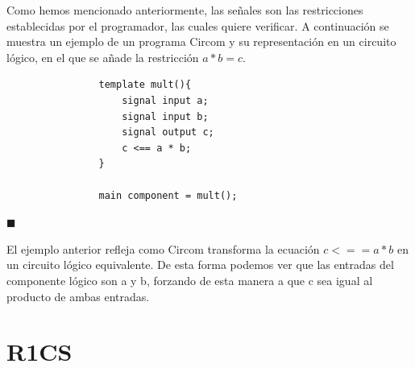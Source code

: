 \documentclass[a4paper,12pt]{report}
\begin{document}
	
	\vspace{0.3cm}
	\vspace{0.5cm}
	
	\noindent Como hemos mencionado anteriormente, las señales son las restricciones establecidas por el programador, las cuales quiere verificar. A continuación se muestra un ejemplo de un programa Circom y su representación en un circuito lógico, en el que se añade la restricción $a*b=c$.
	
	
	\begin{mi_ejemplo}[H]
		\centering
		\begin{minipage}{0.55\textwidth}
			\lstset{
				language=Circom,
				basicstyle=\footnotesize\ttfamily, 
				frame=single,
				breaklines=true
			}
			\begin{lstlisting}
				template mult(){
					signal input a;
					signal input b;
					signal output c;
					c <== a * b;
				}
				
				main component = mult();
			\end{lstlisting}
		\end{minipage}
		\hfill
		
		\begin{minipage}{0.45\textwidth}
			\centering
		\end{minipage}
		
		\caption{Ilustración comparativa código-circuito}
		\label{ex:varA-dist-zero}
		
		\hspace*{\fill} $\blacksquare$
	\end{mi_ejemplo}
	
	\vspace{0.2cm}
	
	\noindent El ejemplo anterior refleja como Circom transforma la ecuación $c<==a*b$ en un circuito lógico equivalente. De esta forma podemos ver que las entradas del componente lógico son a y b, forzando de esta manera a que c sea igual al producto de ambas entradas. 
	
	
	\section{R1CS}
	\label{sec:r1cs}
	
\end{document}
